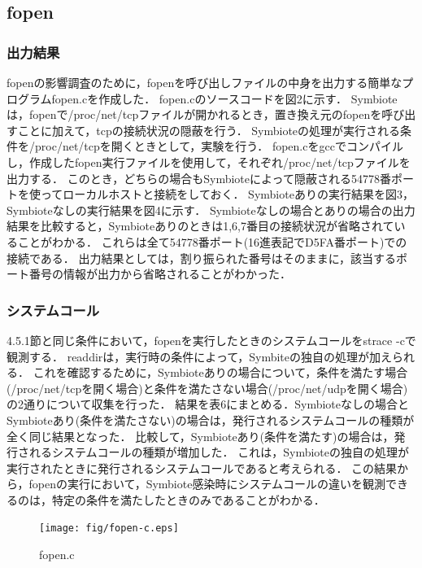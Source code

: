 \documentclass[submit,techreq,noauthor]{eco}	%
\begin{document}
\subsection{fopen}
\subsubsection{出力結果}
fopenの影響調査のために，fopenを呼び出しファイルの中身を出力する簡単なプログラムfopen.cを作成した．
fopen.cのソースコードを図2に示す．
Symbioteは，fopenで/proc/net/tcpファイルが開かれるとき，置き換え元のfopenを呼び出すことに加えて，tcpの接続状況の隠蔽を行う．
Symbioteの処理が実行される条件を/proc/net/tcpを開くときとして，実験を行う．
fopen.cをgccでコンパイルし，作成したfopen実行ファイルを使用して，それぞれ/proc/net/tcpファイルを出力する．
このとき，どちらの場合もSymbioteによって隠蔽される54778番ポートを使ってローカルホストと接続をしておく．
Symbioteありの実行結果を図3，Symbioteなしの実行結果を図4に示す．
Symbioteなしの場合とありの場合の出力結果を比較すると，Symbioteありのときは1,6,7番目の接続状況が省略されていることがわかる．
これらは全て54778番ポート(16進表記でD5FA番ポート)での接続である．
出力結果としては，割り振られた番号はそのままに，該当するポート番号の情報が出力から省略されることがわかった．\\

\subsubsection{システムコール}
4.5.1節と同じ条件において，fopenを実行したときのシステムコールをstrace -cで観測する．
readdirは，実行時の条件によって，Symbiteの独自の処理が加えられる．
これを確認するために，Symbioteありの場合について，条件を満たす場合(/proc/net/tcpを開く場合)と条件を満たさない場合(/proc/net/udpを開く場合)の2通りについて収集を行った．
結果を表6にまとめる．Symbioteなしの場合とSymbioteあり(条件を満たさない)の場合は，発行されるシステムコールの種類が全く同じ結果となった．
比較して，Symbioteあり(条件を満たす)の場合は，発行されるシステムコールの種類が増加した．
これは，Symbioteの独自の処理が実行されたときに発行されるシステムコールであると考えられる．
この結果から，fopenの実行において，Symbiote感染時にシステムコールの違いを観測できるのは，特定の条件を満たしたときのみであることがわかる．

\begin{figure}[t]
	\centering
  \texttt{[image: fig/fopen-c.eps]}
	\caption{fopen.c}
	\label{fig:fopen.c}
\end{figure}
\end{document}
